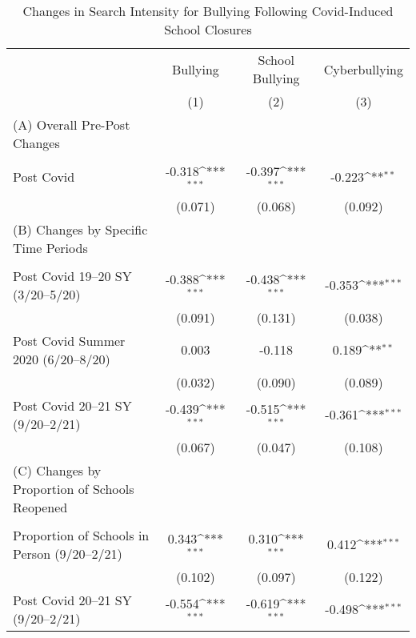 \begin{table}[htbp] \centering
\def\sym#1{\ifmmode^{#1}\else\(^{#1}\)\fi}
\caption{Changes in Search Intensity for Bullying Following Covid-Induced School Closures}
\label{t_post_reg}
\begin{tabular*}{1\textwidth}{@{\extracolsep{\fill}}l*{3}{c}}
\midrule
&Bullying&School Bullying&Cyberbullying\\
&(1)&(2)&(3)\\
\midrule
(A) Overall Pre-Post Changes \\
\cmidrule{1-1} \vspace{-1em} \\
[1em]
Post Covid          &      -0.318\sym{***}&      -0.397\sym{***}&      -0.223\sym{**} \\
                    &     (0.071)         &     (0.068)         &     (0.092)         \\
[1em]
\cmidrule{1-1}
(B) Changes by Specific Time Periods \\
\cmidrule{1-1} \vspace{-1em} \\
[1em]
Post Covid 19--20 SY (3/20--5/20)&      -0.388\sym{***}&      -0.438\sym{***}&      -0.353\sym{***}\\
                    &     (0.091)         &     (0.131)         &     (0.038)         \\
[1em]
Post Covid Summer 2020 (6/20--8/20)&       0.003         &      -0.118         &       0.189\sym{**} \\
                    &     (0.032)         &     (0.090)         &     (0.089)         \\
[1em]
Post Covid 20--21 SY (9/20--2/21)&      -0.439\sym{***}&      -0.515\sym{***}&      -0.361\sym{***}\\
                    &     (0.067)         &     (0.047)         &     (0.108)         \\
[1em]
\cmidrule{1-1}
(C) Changes by Proportion of Schools Reopened \\
\cmidrule{1-1} \vspace{-1em} \\
[1em]
Proportion of Schools in Person (9/20--2/21)&       0.343\sym{***}&       0.310\sym{***}&       0.412\sym{***}\\
                    &     (0.102)         &     (0.097)         &     (0.122)         \\
[1em]
Post Covid 20--21 SY (9/20--2/21)&      -0.554\sym{***}&      -0.619\sym{***}&      -0.498\sym{***}\\

\end{tabular*}
\end{table}
